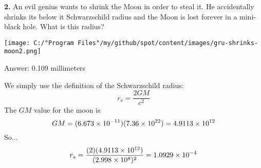 \documentclass{article}
\begin{document}
\textbf{2.} \quad An evil genius wants to shrink the Moon in order to steal it. He
accidentally shrinks its below it Schwarzschild radius and the Moon
is lost forever in a mini-black hole. What is this radius?


\begin{center}
\texttt{[image: C:/"Program Files"/my/github/spot/content/images/gru-shrinks-moon2.png]}

\label{fig:gru-shrinks-moon2-png}
\end{center}
\par {\footnotesize\sf Answer: 0.109 millimeters}
\par We simply use the definition of the Schwarzschild radius:
%
\begin{equation*}
r_s = \frac{2GM}{c^2}
\end{equation*}
The $GM$ value for the moon is
%
\begin{equation*}
GM = (6.673 \times 10^{-11})(7.36 \times 10^{22})
= 4.9113 \times 10^{12}
\end{equation*}
So...
%
\begin{equation*}
r_s = \frac{(2)(4.9113 \times 10^{12})}{(2.998 \times 10^{8})^2}
= 1.0929 \times 10^{-4}
\end{equation*}
\newpage
\end{document}
